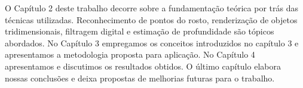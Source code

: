 O Capítulo 2 deste trabalho decorre sobre a fundamentação teórica 
por trás das técnicas utilizadas. Reconhecimento de pontos do rosto,
renderização de objetos tridimensionais, filtragem digital e estimação de
profundidade são tópicos abordados. No Capítulo 3 empregamos os conceitos
introduzidos no capítulo 3 e apresentamos a metodologia proposta para aplicação.
No Capítulo 4 apresentamos e discutimos os resultados obtidos. O último capítulo
elabora nossas conclusões e deixa propostas de melhorias futuras para o
trabalho.
